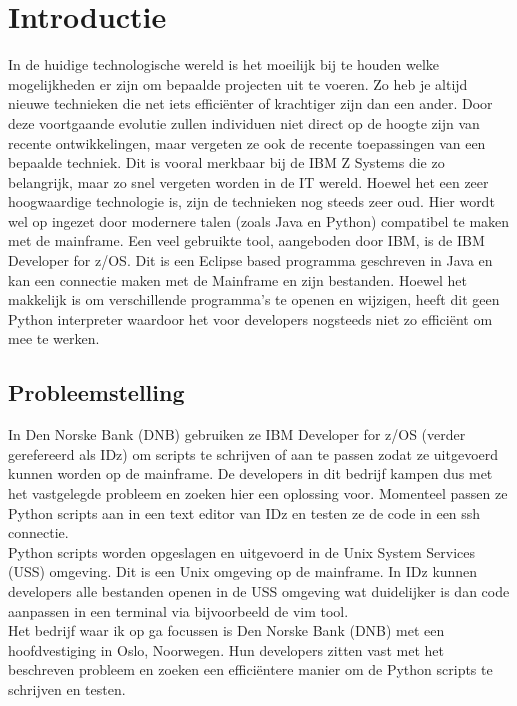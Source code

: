 
\section{Introductie}%
\label{sec:introductie}
In de huidige technologische wereld is het moeilijk bij te houden welke mogelijkheden er zijn om bepaalde projecten uit te voeren. Zo heb je altijd nieuwe technieken die net iets efficiënter of krachtiger zijn dan een ander. Door deze voortgaande evolutie zullen individuen niet direct op de hoogte zijn van recente ontwikkelingen, maar vergeten ze ook de recente toepassingen van een bepaalde techniek. Dit is vooral merkbaar bij de IBM Z Systems die zo belangrijk, maar zo snel vergeten worden in de IT wereld. Hoewel het een zeer hoogwaardige technologie is, zijn de technieken nog steeds zeer oud. Hier wordt wel op ingezet door modernere talen (zoals Java en Python) compatibel te maken met de mainframe. Een veel gebruikte tool, aangeboden door IBM, is de IBM Developer for z/OS. Dit is een Eclipse based programma geschreven in Java en kan een connectie maken met de Mainframe en zijn bestanden. Hoewel het makkelijk is om verschillende programma's te openen en wijzigen, heeft dit geen Python interpreter waardoor het voor developers nogsteeds niet zo efficiënt om mee te werken.


\subsection{Probleemstelling}
In Den Norske Bank (DNB) gebruiken ze IBM Developer for z/OS (verder gerefereerd als IDz) om scripts te schrijven of aan te passen zodat ze uitgevoerd kunnen worden op de mainframe. De developers in dit bedrijf kampen dus met het vastgelegde probleem en zoeken hier een oplossing voor. Momenteel passen ze Python scripts aan in een text editor van IDz en testen ze de code in een ssh connectie. \\
Python scripts worden opgeslagen en uitgevoerd in de Unix System Services (USS) omgeving. Dit is een Unix omgeving op de mainframe. In IDz kunnen developers alle bestanden openen in de USS omgeving wat duidelijker is dan code aanpassen in een terminal via bijvoorbeeld de vim tool.  
\\
Het bedrijf waar ik op ga focussen is Den Norske Bank (DNB) met een hoofdvestiging in Oslo, Noorwegen. Hun developers zitten vast met het beschreven probleem en zoeken een efficiëntere manier om de Python scripts te schrijven en testen. 




